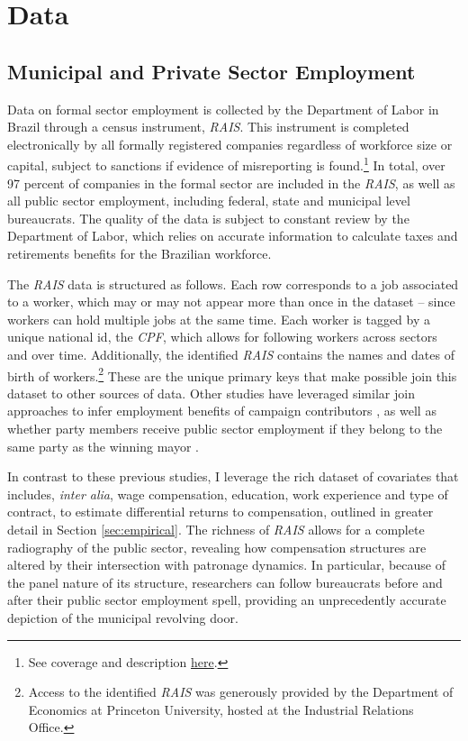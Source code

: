 \documentclass[12pt,a4paper]{article}
\begin{document}
\section{Data}
\label{sec:data}

\subsection{Municipal and Private Sector Employment}

Data on formal sector employment is collected by the Department of Labor in Brazil through a census instrument, \emph{RAIS}. This instrument is completed electronically by all formally registered companies regardless of workforce size or capital, subject to sanctions if evidence of misreporting is found.\footnote{See coverage and description \href{https://agenciabrasil.ebc.com.br/economia/noticia/2020-03/prazo-para-entrega-da-rais-comeca-hoje-e-vai-ate-17-de-abril}{here}.} In total, over 97 percent of companies in the formal sector are included in the \emph{RAIS}, as well as all public sector employment, including federal, state and municipal level bureaucrats. The quality of the data is subject to constant review by the Department of Labor, which relies on accurate information to calculate taxes and retirements benefits for the Brazilian workforce. 

The \emph{RAIS} data is structured as follows. Each row corresponds to a job associated to a worker, which may or may not appear more than once in the dataset -- since workers can hold multiple jobs at the same time. Each worker is tagged by a unique national id, the \emph{CPF}, which allows for following workers across sectors and over time. Additionally, the identified \emph{RAIS} contains the names and dates of birth of workers.\footnote{Access to the identified \emph{RAIS} was generously provided by the Department of Economics at Princeton University, hosted at the Industrial Relations Office.} These are the unique primary keys that make possible join this dataset to other sources of data. Other studies have leveraged similar join approaches to infer employment benefits of campaign contributors \citep{colonnelli2018patronage}, as well as whether party members receive public sector employment if they belong to the same party as the winning mayor \citep{brollo2017victor}.

In contrast to these previous studies, I leverage the rich dataset of covariates that includes, \emph{inter alia}, wage compensation, education, work experience and type of contract, to estimate differential returns to compensation, outlined in greater detail in Section \ref{sec:empirical}. The richness of \emph{RAIS} allows for a complete radiography of the public sector, revealing how compensation structures are altered by their intersection with patronage dynamics. In particular, because of the panel nature of its structure, researchers can follow bureaucrats before and after their public sector employment spell, providing an unprecedently accurate depiction of the municipal revolving door.
\end{document}
